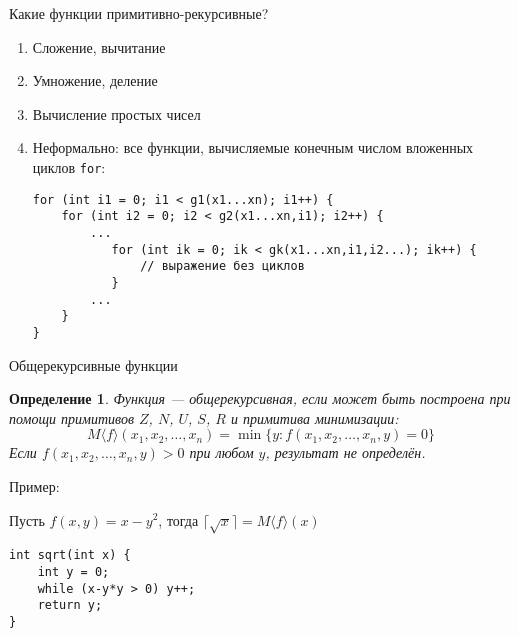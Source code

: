 \documentclass[handout]{beamer}
\newtheorem{dfn}{Определение}[section]
\begin{document}
\begin{frame}[fragile]{Какие функции примитивно-рекурсивные?}
\begin{enumerate}
\item Сложение, вычитание\pause
\item Умножение, деление\pause
\item Вычисление простых чисел\pause
\item Неформально: все функции, вычисляемые конечным числом вложенных циклов \verb!for!:

\begin{verbatim}
for (int i1 = 0; i1 < g1(x1...xn); i1++) {
    for (int i2 = 0; i2 < g2(x1...xn,i1); i2++) {
        ...
           for (int ik = 0; ik < gk(x1...xn,i1,i2...); ik++) {
               // выражение без циклов
           }
        ...
    }
}
\end{verbatim}
\end{enumerate}
\end{frame}

\begin{frame}[fragile]{Общерекурсивные функции}
\begin{dfn}
Функция --- общерекурсивная, если может быть построена при помощи
примитивов $Z$, $N$, $U$, $S$, $R$ и примитива минимизации:
$$M\langle f \rangle (x_1,x_2,\dots,x_n) = \min\{y: f(x_1,x_2,\dots,x_n,y) = 0\}$$
Если $f(x_1,x_2,\dots,x_n,y) > 0$ при любом $y$, результат не определён.
\end{dfn}\pause


Пример:

Пусть $f(x,y) = x-y^2$, тогда $\lceil\sqrt{x}\rceil = M\langle f\rangle (x)$

\begin{verbatim}
int sqrt(int x) {
    int y = 0;
    while (x-y*y > 0) y++;
    return y;
}
\end{verbatim}

\end{frame}
\end{document}
